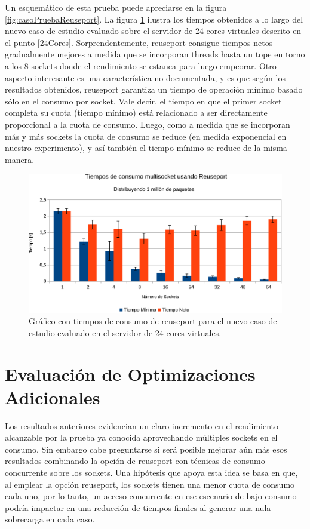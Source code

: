 Un esquemático de esta prueba puede apreciarse en la figura \ref{fig:casoPruebaReuseport}. La figura \ref{fig:resultadosReuseport} ilustra los tiempos obtenidos a lo largo del nuevo caso de estudio evaluado sobre el servidor de 24 cores virtuales descrito en el punto \ref{24Cores}. Sorprendentemente, reuseport consigue tiempos netos gradualmente mejores a medida que se incorporan threads hasta un tope en torno a los 8 sockets donde el rendimiento se estanca para luego empeorar. Otro aspecto interesante es una característica no documentada, y es que según los resultados obtenidos, reuseport garantiza un tiempo de operación mínimo basado sólo en el consumo por socket. Vale decir, el tiempo en que el primer socket completa su cuota (tiempo mínimo) está relacionado a ser directamente proporcional a la cuota de consumo. Luego, como a medida que se incorporan más y más sockets la cuota de consumo se reduce (en medida exponencial en nuestro experimento), y así también el tiempo mínimo se reduce de la misma manera.

\begin{figure}[!h]
	\centering
	\includegraphics[scale=.6]{resultados/reuseport1-crop.pdf}
	\caption{Gráfico con tiempos de consumo de reuseport para el nuevo caso de estudio evaluado en el servidor de 24 cores virtuales.}
	\label{fig:resultadosReuseport}
\end{figure}

\section{Evaluación de Optimizaciones Adicionales}
Los resultados anteriores evidencian un claro incremento en el rendimiento alcanzable por la prueba ya conocida aprovechando múltiples sockets en el consumo. Sin embargo cabe preguntarse si será posible mejorar aún más esos resultados combinando la opción de reuseport con técnicas de consumo concurrente sobre los sockets. Una hipótesis que apoya esta idea se basa en que, al emplear la opción reuseport, los sockets tienen una menor cuota de consumo cada uno, por lo tanto, un acceso concurrente en ese escenario de bajo consumo podría impactar en una reducción de tiempos finales al generar una nula sobrecarga en cada caso.

